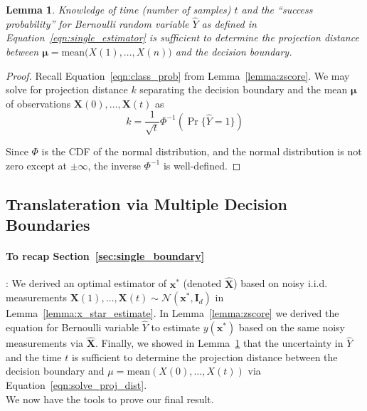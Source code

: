 \documentclass[12pt]{article}
\newtheorem{lemma}{Lemma}
\begin{document}
\begin{lemma}
	\label{lemma:prob_to_dist}
	Knowledge of time (number of samples) $t$ and the ``success probability'' for Bernoulli random variable $\hat Y$ as defined in Equation~\ref{eqn:single_estimator} is sufficient to determine the projection distance between $\mathbf \mu = \text{mean}\big(X(1), \dots, X(n)\big)$ and the decision boundary. 
\end{lemma}
\begin{proof}
	Recall Equation~\ref{eqn:class_prob} from Lemma~\ref{lemma:zscore}. 
	We may solve for projection distance $k$ separating the decision boundary and the mean $\mathbf \mu$ of observations $\mathbf X(0), \dots, \mathbf X(t)$ as 
	\begin{equation}
		\label{eqn:solve_proj_dist}
		k = \frac{1}{\sqrt t}\Phi^{-1}(\Pr\{\hat Y = 1\})
	\end{equation}

	Since $\Phi$ is the CDF of the normal distribution, and the normal distribution is not zero except at $\pm \infty$, the inverse $\Phi^{-1}$ is well-defined.
\end{proof}


\subsection{Translateration via Multiple Decision Boundaries}

\paragraph{To recap Section~\ref{sec:single_boundary}}: 
We derived an optimal estimator of $\mathbf x^*$ (denoted $\hat{\mathbf X}$) based on noisy i.i.d. measurements $\mathbf X(1), \dots, \mathbf X(t) \sim \mathcal N(\mathbf x^*, \mathbf I_d)$ in Lemma~\ref{lemma:x_star_estimate}. 
In Lemma~\ref{lemma:zscore} we derived the equation for Bernoulli variable $\hat Y$ to estimate $y(\mathbf x^*)$ based on the same noisy measurements via $\hat{\mathbf X}$.
Finally, we showed in Lemma~\ref{lemma:prob_to_dist} that the uncertainty in $\hat Y$ and the time $t$ is sufficient to determine the projection distance between the decision boundary and $\mu = \text{mean}(X(0), \dots, X(t))$ via Equation~\ref{eqn:solve_proj_dist}. \\


We now have the tools to prove our final result. 
\end{document}
